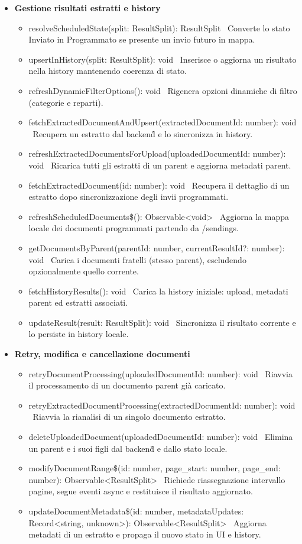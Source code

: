\documentclass[a4paper,11pt]{article}
\begin{document}
\begin{itemize}[noitemsep, topsep=0pt]
\item \textbf{Gestione risultati estratti e history}
\begin{itemize}[noitemsep, topsep=0pt]
\item resolveScheduledState(split: ResultSplit): ResultSplit \
Converte lo stato Inviato in Programmato se presente un invio futuro in mappa.
\item upsertInHistory(split: ResultSplit): void \
Inserisce o aggiorna un risultato nella history mantenendo coerenza di stato.
\item refreshDynamicFilterOptions(): void \
Rigenera opzioni dinamiche di filtro (categorie e reparti).
\item fetchExtractedDocumentAndUpsert(extractedDocumentId: number): void \
Recupera un estratto dal backend\G{} e lo sincronizza in history.
\item refreshExtractedDocumentsForUpload(uploadedDocumentId: number): void \
Ricarica tutti gli estratti di un parent e aggiorna metadati parent.
\item fetchExtractedDocument(id: number): void \
Recupera il dettaglio di un estratto dopo sincronizzazione degli invii programmati.
\item refreshScheduledDocuments\$(): Observable<void> \
Aggiorna la mappa locale dei documenti programmati partendo da /sendings.
\item getDocumentsByParent(parentId: number, currentResultId?: number): void \
Carica i documenti fratelli (stesso parent), escludendo opzionalmente quello corrente.
\item fetchHistoryResults(): void \
Carica la history iniziale: upload, metadati parent ed estratti associati.
\item updateResult(result: ResultSplit): void \
Sincronizza il risultato corrente e lo persiste in history locale.
\end{itemize}

\item \textbf{Retry, modifica e cancellazione documenti}
\begin{itemize}[noitemsep, topsep=0pt]
\item retryDocumentProcessing(uploadedDocumentId: number): void \
Riavvia il processamento di un documento parent già caricato.
\item retryExtractedDocumentProcessing(extractedDocumentId: number): void \
Riavvia la rianalisi di un singolo documento estratto.
\item deleteUploadedDocument(uploadedDocumentId: number): void \
Elimina un parent e i suoi figli dal backend\G{} e dallo stato locale.
\item modifyDocumentRange\$(id: number, page_start: number, page_end: number): Observable<ResultSplit> \
Richiede riassegnazione intervallo pagine, segue eventi async e restituisce il risultato aggiornato.
\item updateDocumentMetadata\$(id: number, metadataUpdates: Record<string, unknown>): Observable<ResultSplit> \
Aggiorna metadati di un estratto e propaga il nuovo stato in UI e history.
\end{itemize}


\end{itemize}
\end{document}
